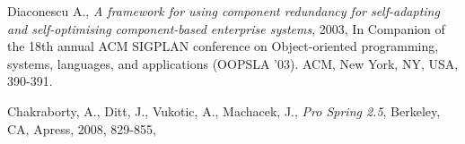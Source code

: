 \documentclass[10pt,a4paper]{article}
\begin{document}
\begin{thebibliography}{9}
Diaconescu A., \textit{A framework for using component redundancy for self-adapting and self-optimising component-based enterprise systems}, 2003, In Companion of the 18th annual ACM SIGPLAN conference on Object-oriented programming, systems, languages, and applications (OOPSLA '03). ACM, New York, NY, USA, 390-391. 

Chakraborty, A., Ditt, J., Vukotic, A., Machacek, J., \textit{Pro Spring 2.5}, Berkeley, CA, Apress, 2008, 829-855,  


\end{thebibliography}
\end{document}
